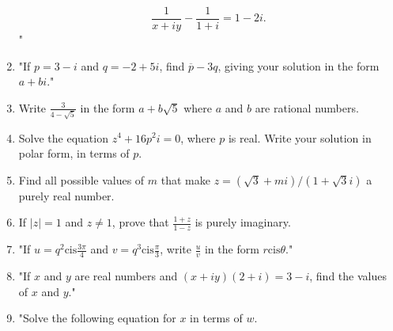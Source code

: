\documentclass{article}
\begin{document}
\begin{enumerate}
\[
\frac{1}{x + iy} - \frac{1}{1 + i} = 1 - 2i.
\]"
\vspace{3cm}
\item "If \( p = 3 - i \) and \( q = -2 + 5i \), find \( \overline{p} - 3q \), giving your solution in the form \( a + bi \)."
\vspace{3cm}
\item Write \( \frac{3}{4 - \sqrt{5}} \) in the form \( a + b\sqrt{5} \) where \( a \) and \( b \) are rational numbers.
\vspace{3cm}
\item Solve the equation \( z^4 + 16p^2i = 0 \), where \( p \) is real. Write your solution in polar form, in terms of \( p \).
\vspace{3cm}
\item Find all possible values of \( m \) that make \( z = (\sqrt{3} + mi) / (1 + \sqrt{3}i) \) a purely real number.
\vspace{3cm}
\item If \( |z| = 1 \) and \( z \neq 1 \), prove that \(\frac{1+z}{1-z}\) is purely imaginary.
\vspace{3cm}
\item "If \( u = q^2 \text{cis} \frac{3\pi}{4} \) and \( v = q^3 \text{cis} \frac{\pi}{3} \), write \( \frac{u}{v} \) in the form \( r \text{cis} \theta \)."
\vspace{3cm}
\item "If \( x \) and \( y \) are real numbers and \( (x + iy)(2 + i) = 3 - i \), find the values of \( x \) and \( y \)."
\vspace{3cm}
\item "Solve the following equation for \( x \) in terms of \( w \).


\end{enumerate}
\end{document}
